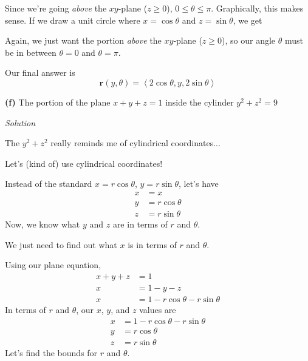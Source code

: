 \documentclass{article}
\newcommand{\lra}[1]{\left\langle #1 \right\rangle}
\renewcommand{\r}[0]{\mathbf{r}}
\newcommand{\Solution}{\textit{Solution}}
\begin{document}
Since we're going \textit{above} the $xy$-plane ($z\geq 0$), $0\leq \theta\leq \pi$. Graphically, this makes sense. If we draw a unit circle where $x=\cos \theta$ and $z=\sin\theta$, we get
\begin{center}
\end{center}
Again, we just want the portion \textit{above} the $xy$-plane ($z\geq 0$), so our angle $\theta$ must be in between $\theta=0$ and $\theta=\pi$.

Our final answer is
\begin{equation*}
    \boxed{\r(y,\theta)=\lra{2\cos\theta, y,2\sin\theta}}\tag{$-2\leq y\leq 2$, $0\leq \theta\leq \pi$}
\end{equation*}

{}\textbf{(f)} The portion of the plane $x + y + z = 1$ inside the cylinder $y^2+z^2=9$

\Solution

The $y^2+z^2$ really reminds me of cylindrical coordinates...

Let's (kind of) use cylindrical coordinates!

Instead of the standard $x=r\cos\theta$, $y=r\sin\theta$, let's have
\begin{align*}
    x&=x\\
    y&=r\cos\theta\\
    z&=r\sin\theta
\end{align*}
Now, we know what $y$ and $z$ are in terms of $r$ and $\theta$.

We just need to find out what $x$ is in terms of $r$ and $\theta$.

Using our plane equation,
\begin{align*}
    x+y+z&=1\\
    x&=1-y-z\\
    x&=1-r\cos\theta-r\sin\theta
\end{align*}
In terms of $r$ and $\theta$, our $x$, $y$, and $z$ values are
\begin{align*}
    x&=1-r\cos\theta-r\sin\theta\\
    y&=r\cos\theta\\
    z&=r\sin\theta
\end{align*}
Let's find the bounds for $r$ and $\theta$.
\end{document}
